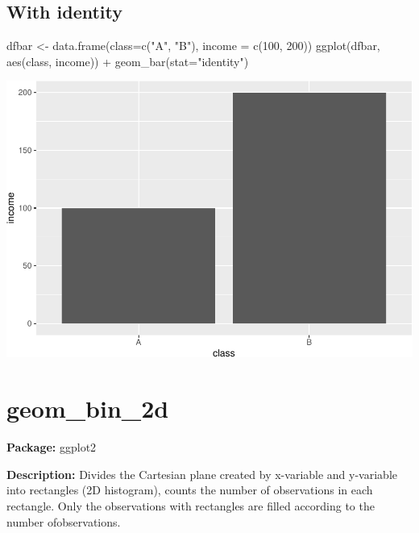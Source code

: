 \documentclass[
]{book}
\newenvironment{Shaded}{\begin{snugshade}}{\end{snugshade}}
\newcommand{\AttributeTok}[1]{\textcolor[rgb]{0.77,0.63,0.00}{#1}}
\newcommand{\DecValTok}[1]{\textcolor[rgb]{0.00,0.00,0.81}{#1}}
\newcommand{\FunctionTok}[1]{\textcolor[rgb]{0.00,0.00,0.00}{#1}}
\newcommand{\NormalTok}[1]{#1}
\newcommand{\OtherTok}[1]{\textcolor[rgb]{0.56,0.35,0.01}{#1}}
\newcommand{\SpecialCharTok}[1]{\textcolor[rgb]{0.00,0.00,0.00}{#1}}
\newcommand{\StringTok}[1]{\textcolor[rgb]{0.31,0.60,0.02}{#1}}
\begin{document}
\hypertarget{with-identity}{%
\subsection{With identity}\label{with-identity}}

\begin{Shaded}
\begin{Highlighting}[]
\NormalTok{dfbar }\OtherTok{\textless{}{-}} \FunctionTok{data.frame}\NormalTok{(}\AttributeTok{class=}\FunctionTok{c}\NormalTok{(}\StringTok{"A"}\NormalTok{, }\StringTok{"B"}\NormalTok{),  }\AttributeTok{income =} \FunctionTok{c}\NormalTok{(}\DecValTok{100}\NormalTok{, }\DecValTok{200}\NormalTok{))}
\FunctionTok{ggplot}\NormalTok{(dfbar, }\FunctionTok{aes}\NormalTok{(class, income)) }\SpecialCharTok{+}
  \FunctionTok{geom\_bar}\NormalTok{(}\AttributeTok{stat=}\StringTok{"identity"}\NormalTok{)}
\end{Highlighting}
\end{Shaded}

\includegraphics{Data-Visualisation-geom-Encyclopedia_files/figure-latex/unnamed-chunk-22-1.pdf}

\hypertarget{geom_bin_2d}{%
\section{geom\_bin\_2d}\label{geom_bin_2d}}

\textbf{Package: } ggplot2 \autocite{R-ggplot2}

\textbf{Description: } Divides the Cartesian plane created by x-variable and y-variable into rectangles (2D histogram), counts the number of observations in each rectangle. Only the observations with rectangles are filled according to the number ofobservations.
\end{document}
